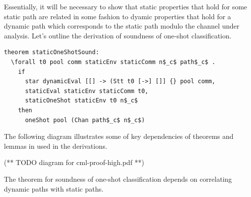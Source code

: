 \documentclass[10pt]{article}
\begin{document}
Essentially, it will be necessary to show that static
properties that hold for some static path are related in some fashion to dyamic properties
that hold for a dynamic path which corresponds to the static path modulo the channel under
analysis. Let's outline the derivation of soundness of one-shot classification.

\begin{lstlisting}[language=logic, mathescape]
  theorem staticOneShotSound:
  \forall t0 pool comm staticEnv staticComm n$_c$ path$_c$ . 
    if
      star dynamicEval [[] -> (Stt t0 [->] []] {} pool comm,
      staticEval staticEnv staticComm t0,
      staticOneShot staticEnv t0 n$_c$
    then 
      oneShot pool (Chan path$_c$ n$_c$)
\end{lstlisting}

The following diagram illustrates some of key dependencies of theorems and lemmas in
used in the derivations.

(** TODO diagram for cml-proof-high.pdf **)

The theorem for soundness of one-shot classification depends on
correlating dynamic paths with static paths.
\end{document}
